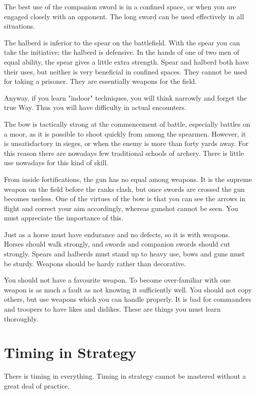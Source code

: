 \documentclass[12pt]{report}
\begin{document}
The best use of the companion sword is in a confined space, or when you are engaged closely with an opponent. The long sword can be used effectively in all situations.

The halberd is inferior to the spear on the battlefield. With the spear you can take the initiative; the halberd is defensive. In the hands of one of two men of equal ability, the spear gives a little extra strength. Spear and halberd both have their uses, but neither is very beneficial in confined spaces. They cannot be used for taking a prisoner. They are essentially weapons for the field.

Anyway, if you learn "indoor" techniques, you will think narrowly and forget the true Way. Thus you will have difficulty in actual encounters.

The bow is tactically strong at the commencement of battle, especially battles on a moor, as it is possible to shoot quickly from among the spearmen. However, it is unsatisfactory in sieges, or when the enemy is more than forty yards away. For this reason there are nowadays few traditional schools of archery. There is little use nowadays for this kind of skill.

From inside fortifications, the gun has no equal among weapons. It is the supreme weapon on the field before the ranks clash, but once swords are crossed the gun becomes useless. One of the virtues of the bow is that you can see the arrows in flight and correct your aim accordingly, whereas gunshot cannot be seen. You must appreciate the importance of this.

Just as a horse must have endurance and no defects, so it is with weapons. Horses should walk strongly, and swords and companion swords should cut strongly. Spears and halberds must stand up to heavy use, bows and guns must be sturdy. Weapons should be hardy rather than decorative.

You should not have a favourite weapon. To become over-familiar with one weapon is as much a fault as not knowing it sufficiently well. You should not copy others, but use weapons which you can handle properly. It is bad for commanders and troopers to have likes and dislikes. These are things you must learn thoroughly.
\section*{Timing in Strategy}
There is timing in everything. Timing in strategy cannot be mastered without a great deal of practice.
\end{document}
